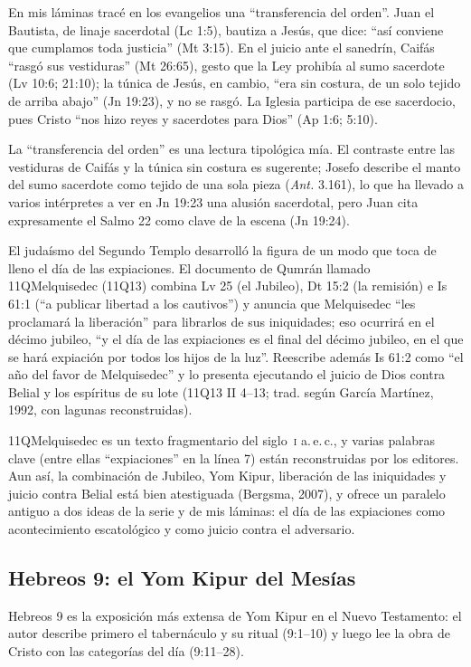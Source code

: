 \documentclass[11pt,letterpaper]{article}
\begin{document}
En mis láminas tracé en los evangelios una ``transferencia del orden''. Juan el Bautista, de linaje sacerdotal (Lc 1:5), bautiza a Jesús, que dice: ``así conviene que cumplamos toda justicia'' (Mt 3:15). En el juicio ante el sanedrín, Caifás ``rasgó sus vestiduras'' (Mt 26:65), gesto que la Ley prohibía al sumo sacerdote (Lv 10:6; 21:10); la túnica de Jesús, en cambio, ``era sin costura, de un solo tejido de arriba abajo'' (Jn 19:23), y no se rasgó. La Iglesia participa de ese sacerdocio, pues Cristo ``nos hizo reyes y sacerdotes para Dios'' (Ap 1:6; 5:10).

\begin{nota}[Precisión]
La ``transferencia del orden'' es una lectura tipológica mía. El contraste entre las vestiduras de Caifás y la túnica sin costura es sugerente; Josefo describe el manto del sumo sacerdote como tejido de una sola pieza (\emph{Ant.} 3.161), lo que ha llevado a varios intérpretes a ver en Jn 19:23 una alusión sacerdotal, pero Juan cita expresamente el Salmo 22 como clave de la escena (Jn 19:24).
\end{nota}

El judaísmo del Segundo Templo desarrolló la figura de un modo que toca de lleno el día de las expiaciones. El documento de Qumrán llamado 11QMelquisedec (11Q13) combina Lv 25 (el Jubileo), Dt 15:2 (la remisión) e Is 61:1 (``a publicar libertad a los cautivos'') y anuncia que Melquisedec ``les proclamará la liberación'' para librarlos de sus iniquidades; eso ocurrirá en el décimo jubileo, ``y el día de las expiaciones es el final del décimo jubileo, en el que se hará expiación por todos los hijos de la luz''. Reescribe además Is 61:2 como ``el año del favor de Melquisedec'' y lo presenta ejecutando el juicio de Dios contra Belial y los espíritus de su lote (11Q13 II 4--13; trad. según García Martínez, 1992, con lagunas reconstruidas).

\begin{nota}[Precisión]
11QMelquisedec es un texto fragmentario del siglo~\textsc{i} a.\,e.\,c., y varias palabras clave (entre ellas ``expiaciones'' en la línea 7) están reconstruidas por los editores. Aun así, la combinación de Jubileo, Yom Kipur, liberación de las iniquidades y juicio contra Belial está bien atestiguada (Bergsma, 2007), y ofrece un paralelo antiguo a dos ideas de la serie y de mis láminas: el día de las expiaciones como acontecimiento escatológico y como juicio contra el adversario.
\end{nota}

\subsection{Hebreos 9: el Yom Kipur del Mesías}
Hebreos 9 es la exposición más extensa de Yom Kipur en el Nuevo Testamento: el autor describe primero el tabernáculo y su ritual (9:1--10) y luego lee la obra de Cristo con las categorías del día (9:11--28).
\end{document}
